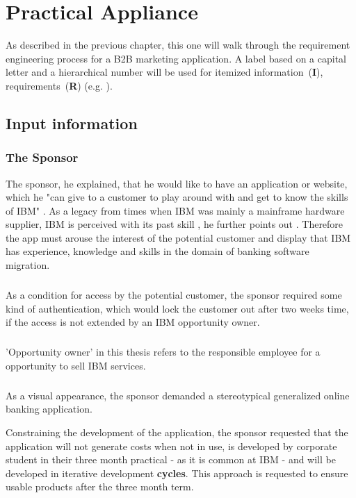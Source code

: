 \chapter{Practical Appliance}
As described in the previous chapter, this one will walk through the requirement engineering process for a B2B marketing application. A label based on a capital letter and a hierarchical number will be used for itemized \mbox{information (\textbf{I})}, \mbox{requirements (\textbf{R})} (e.g. ).
\section{Input information}
\subsection{The Sponsor}
The sponsor, he explained, that he would like to have an application or website, which he "can give to a customer to play around with and get to know the skills of IBM" \parencite{Sachs.20.04.2017b}. As a legacy from times when IBM was mainly a mainframe hardware supplier, IBM is perceived with its past skill , he further points out \parencite{Sachs.20.04.2017b}. Therefore the app must arouse the interest of the potential customer and display that IBM has experience, knowledge and skills in the domain of banking software migration. 

\paragraph{} As a condition for access by the potential customer, the sponsor required some kind of authentication, which would lock the customer out after two weeks time, if the access is not extended by an IBM opportunity owner.

\paragraph{} 'Opportunity owner' in this thesis refers to the responsible employee for a opportunity to sell IBM services.

\paragraph{} As a visual appearance, the sponsor demanded a stereotypical generalized online banking application.

Constraining the development of the application, the sponsor requested that the application will not generate costs when not in use, is developed by corporate student in their three month practical - as it is common at IBM - and will be developed in iterative development \textbf{cycles}. This approach is requested to ensure usable products after the three month term.

